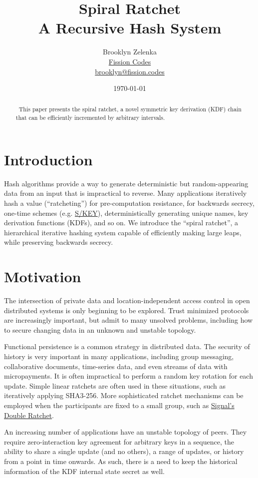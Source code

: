 \documentclass{article}
\title{Spiral Ratchet \\[1ex] \large A Recursive Hash System}
\author{Brooklyn Zelenka \\ \href{https://fission.codes}{Fission Codes} \\ \href{mailto:brooklyn@fission.codes}{brooklyn@fission.codes} }
\date{\today}
\begin{document}
    \maketitle
   	\begin{abstract}\
   		This paper presents the spiral ratchet, a novel symmetric key derivation (KDF) chain that can be efficiently incremented by arbitrary intervals.
   	\end{abstract}

   	\section{Introduction}
   	
	Hash algorithms provide a way to generate deterministic but random-appearing data from an input that is impractical to reverse. Many applications iteratively hash a value (``ratcheting'') for pre-computation resistance, for backwards secrecy, one-time schemes (e.g. \href{https://datatracker.ietf.org/doc/html/rfc1760}{S/KEY}), deterministically generating unique names, key derivation functions (KDFs), and so on. We introduce the ``spiral ratchet'', a hierarchical iterative hashing system capable of efficiently making large leaps, while preserving backwards secrecy.

    \section{Motivation}
    
    The intersection of private data and location-independent access control in open distributed systems is only beginning to be explored. Trust minimized protocols are increasingly important, but admit to many unsolved problems, including how to secure changing data in an unknown and unstable topology.
    
    Functional persistence is a common strategy in distributed data. The security of history is very important in many applications, including group messaging, collaborative documents, time-series data, and even streams of data with micropayments. It is often impractical to perform a random key rotation for each update. Simple linear ratchets are often used in these situations, such as iteratively applying SHA3-256. More sophisticated ratchet mechanisms can be employed when the participants are fixed to a small group, such as \href{https://signal.org/docs/specifications/doubleratchet/doubleratchet.pdf}{Signal's Double Ratchet}.
    
    An increasing number of applications have an unstable topology of peers. They require zero-interaction key agreement for arbitrary keys in a sequence, the ability to share a single update (and no others), a range of updates, or history from a point in time onwards. As such, there is a need to keep the historical information of the KDF internal state secret as well.
    
\end{document}
